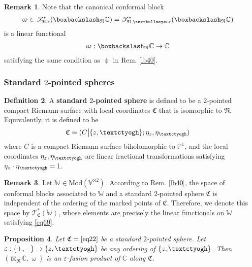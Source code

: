 \documentclass[11pt,b5paper,notitlepage]{article}
\theoremstyle{definition}
\newtheorem{df}{Definition}[section]
\newtheorem{rem}[df]{Remark}
\theoremstyle{plain}
\newtheorem{pp}[df]{Proposition}
\newcommand{\fk}{\mathfrak}
\newcommand{\Vbb}{\mathbb V}
\newcommand{\Wbb}{\mathbb W}
\newcommand{\Cbb}{\mathbb C}
\newcommand{\Pbb}{\mathbb P}
\newcommand{\<}{\left\langle}
\renewcommand{\>}{\right\rangle}
\newcommand{\ST}{\mathscr{T}}
\newcommand{\fc}{\mathfrak{C}}
\newcommand{\bbs}{\boxbackslash}
\newcommand{\Mod}{\mathrm{Mod}}
\newcommand{\eps}{\varepsilon}
\newcommand{\fn}{\mathfrak{N}}
\newcommand{\tipaz}{\text{\textctyogh}}
\newcommand{\tipath}{\text{\textbullseye}}
\numberwithin{equation}{section}
\begin{document}
\begin{rem}
Note that the canonical conformal block
\begin{align*}
\upomega\in\ST^*_{\fn,\epsilon}(\bbs_\fn\Cbb)=\ST^*_{\fn,\tipath\circ\epsilon}(\bbs_\fn\Cbb)
\end{align*}
is a linear functional
\begin{align*}
\upomega:\bbs_\fn\Cbb\rightarrow\Cbb
\end{align*}
satisfying the same condition as $\upphi$ in Rem. \ref{lb40}.
\end{rem}





\subsubsection{Standard $2$-pointed spheres}

\begin{df}\label{lb43}
A \textbf{standard $2$-pointed sphere} is defined to be a $2$-pointed compact Riemann surface with local coordinates $\fk C$ that is isomorphic to $\fn$. Equivalently, it is defined to be
\begin{align}\label{eq22}
\fk C=(C\big| \{z,\tipaz\};\eta_z,\eta_\tipaz)
\end{align}
where $C$ is a compact Riemann surface biholomorphic to $\Pbb^1$, and the local coordinates $\eta_z,\eta_\tipaz$ are linear fractional transformations satisfying $\eta_z\cdot\eta_\tipaz=1$.
\end{df}

\begin{rem}\label{lb59}
Let $\Wbb\in\Mod(\Vbb^{\otimes2})$. According to Rem. \ref{lb40}, the space of conformal blocks associated to $\Wbb$ and a standard $2$-pointed sphere $\fk C$ is independent of the ordering of the marked points of $\fk C$. Therefore, we denote this space by $\pmb{\ST^*_{\fk C}(\Wbb)}$, whose elements are precisely the linear functionals on $\Wbb$ satisfying \eqref{eq69}.
\end{rem}




\begin{pp}\label{lb13}
Let $\fc=\eqref{eq22}$ be a standard $2$-pointed sphere. Let $\eps:\{+,-\}\rightarrow\{z,\tipaz\}$ be any ordering of $\{z,\tipaz\}$. Then $(\boxtimes_\fn\Cbb,\upomega)$ is an $\eps$-fusion product of $\Cbb$ along $\fc$.
\end{pp}
\end{document}
